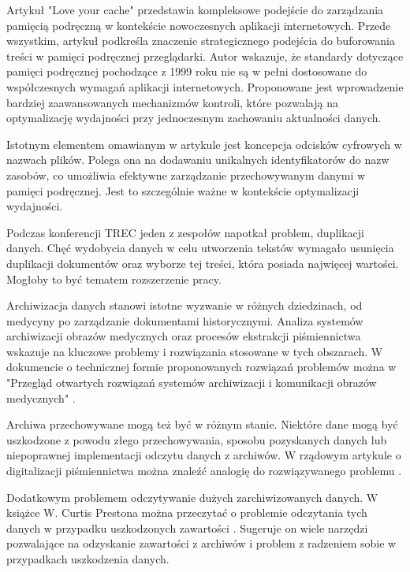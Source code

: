 Artykuł "Love your cache" \cite{bib:internet:TwojaPamiećPodręczna} przedstawia
kompleksowe podejście do zarządzania 
pamięcią podręczną w kontekście nowoczesnych aplikacji internetowych. Przede 
wszystkim, artykuł podkreśla znaczenie strategicznego podejścia do buforowania 
treści w pamięci podręcznej przeglądarki. Autor wskazuje, że standardy 
dotyczące pamięci podręcznej pochodzące z 1999 roku nie są w pełni dostosowane 
do współczesnych wymagań aplikacji internetowych. Proponowane jest wprowadzenie
bardziej zaawansowanych mechanizmów kontroli, które pozwalają na optymalizację
wydajności przy jednoczesnym zachowaniu aktualności danych.

Istotnym elementem omawianym w artykule jest koncepcja odcisków cyfrowych w
nazwach plików. Polega ona na dodawaniu unikalnych identyfikatorów do nazw 
zasobów, co umożliwia efektywne zarządzanie przechowywanym danymi w pamięci 
podręcznej. Jest to szczególnie ważne w kontekście optymalizacji wydajności.

Podczas konferencji TREC \cite{bib:konferencja:TRECDuplicates} jeden z zespołów 
napotkał problem, duplikacji danych. Chęć wydobycia danych w celu utworzenia
tekstów wymagało usunięcia duplikacji dokumentów oraz wyborze tej treści,
która posiada najwięcej wartości. Mogłoby to być tematem rozszerzenie pracy. 

Archiwizacja danych stanowi istotne wyzwanie w różnych dziedzinach, od medycyny 
po zarządzanie dokumentami historycznymi. Analiza systemów archiwizacji obrazów
medycznych oraz procesów ekstrakcji piśmiennictwa wskazuje na kluczowe problemy
i rozwiązania stosowane w tych obszarach. W dokumencie o technicznej formie
proponowanych rozwiązań problemów można w "Przegląd otwartych rozwiązań systemów 
archiwizacji i komunikacji obrazów medycznych" \cite{bib:internet:ArchiwizacjaDanychMedycznych}.

Archiwa przechowywane mogą też być w różnym stanie. Niektóre dane mogą być
uszkodzone z powodu złego przechowywania, sposobu pozyskanych danych lub 
niepoprawnej implementacji odczytu danych z archiwów. W rządowym artykule o
digitalizacji piśmiennictwa można znaleźć analogię do rozwiązywanego problemu \cite{bib:internet:GovDigitalizacjaPiśmiennictwa}.

Dodatkowym problemem odczytywanie dużych zarchiwizowanych danych. W książce W.
Curtis Prestona można przeczytać o problemie odczytania tych danych w przypadku
uszkodzonych zawartości \cite{bib:ksiazka:ArchiwizacjaIOdzyskiwanie}. Sugeruje
on wiele narzędzi pozwalające na odzyskanie zawartości z archiwów i problem
z radzeniem sobie w przypadkach uszkodzenia danych.

